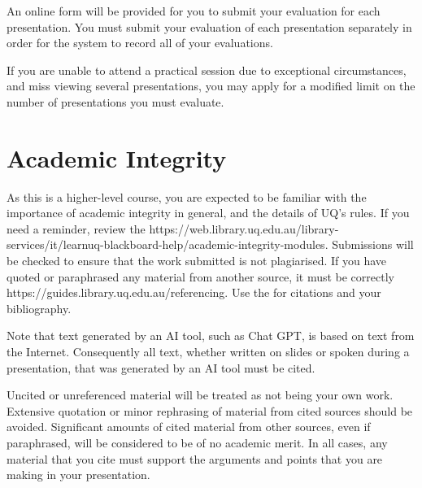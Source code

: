\documentclass{csse4400}
\begin{document}
An online form will be provided for you to submit your evaluation for each presentation.
You must submit your evaluation of each presentation separately in order for the system to record all of your evaluations.

If you are unable to attend a practical session due to exceptional circumstances,
and miss viewing several presentations,
you may apply for a modified limit on the number of presentations you must evaluate.


\section{Academic Integrity}
As this is a higher-level course, you are expected to be familiar with the importance of academic integrity in general,
and the details of UQ's rules.
If you need a reminder, review the 
{https://web.library.uq.edu.au/library-services/it/learnuq-blackboard-help/academic-integrity-modules}.
Submissions will be checked to ensure that the work submitted is not plagiarised.
If you have quoted or paraphrased any material from another source, it must be correctly 
{https://guides.library.uq.edu.au/referencing}.
Use the  for citations and your bibliography.

Note that text generated by an AI tool, such as Chat GPT, is based on text from the Internet.
Consequently all text, whether written on slides or spoken during a presentation,
that was generated by an AI tool must be cited.

Uncited or unreferenced material will be treated as not being your own work.
Extensive quotation or minor rephrasing of material from cited sources should be avoided.
Significant amounts of cited material from other sources, even if paraphrased, will be considered to be of no academic merit.
In all cases, any material that you cite must support the arguments and points that you are making in your presentation.




\end{document}
